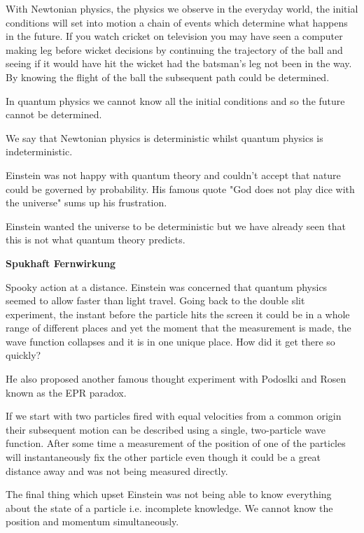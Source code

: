 \documentclass[main.tex]{subfiles}
\begin{document}

With Newtonian physics, the physics we observe in the everyday world, the initial conditions will set into motion a chain of events which determine what happens in the future. If you watch cricket on television you may have seen a computer making leg before wicket decisions by continuing the trajectory of the ball and seeing if it would have hit the wicket had the batsman's leg not been in the way. By knowing the flight of the ball the subsequent path could be determined. 

In quantum physics we cannot know all the initial conditions and so the future cannot be determined.

We say that Newtonian physics is deterministic whilst quantum physics is indeterministic.


Einstein was not happy with quantum theory and couldn't accept that nature could be governed by probability. His famous quote "God does not play dice with the universe" sums up his frustration.

Einstein wanted the universe to be deterministic but we have already seen that this is not what quantum theory predicts.

\textbf{Spukhaft Fernwirkung}

Spooky action at a distance. Einstein was concerned that quantum physics seemed to allow faster than light travel. Going back to the double slit experiment, the instant before the particle hits the screen it could be in a whole range of different places and yet the moment that the measurement is made, the wave function collapses and it is in one unique place. How did it get there so quickly? 

He also proposed another famous thought experiment with Podoslki and Rosen known as the EPR paradox.

If we start with two particles fired with equal velocities from a common origin their subsequent motion can be described using a single, two-particle wave function. After some time a measurement of the position of one of the particles will instantaneously fix the other particle even though it could be a great distance away and was not being measured directly.

The final thing which upset Einstein was not being able to know everything about the state of a particle i.e. incomplete knowledge.
We cannot know the position and momentum simultaneously.
\end{document}
